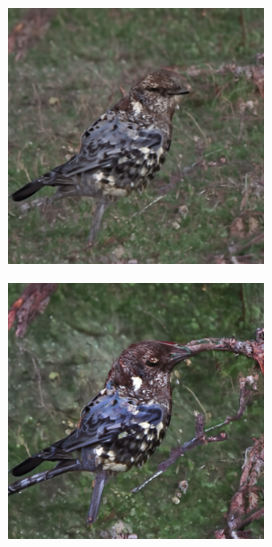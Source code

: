 \documentclass{article}
\begin{document}
\begin{figure}
    \begin{subfigure}[b]{0.19\linewidth}
    \includegraphics[width=\linewidth]{figures/imagenet256/solver_samples/imagenet256_fm_ot_04_05.png}
    \end{subfigure}
    \begin{subfigure}[b]{0.19\linewidth}
    \includegraphics[width=\linewidth]{figures/imagenet256/solver_samples/imagenet256_fm_ot_04_10.png}

\end{subfigure}
\end{figure}
\end{document}
